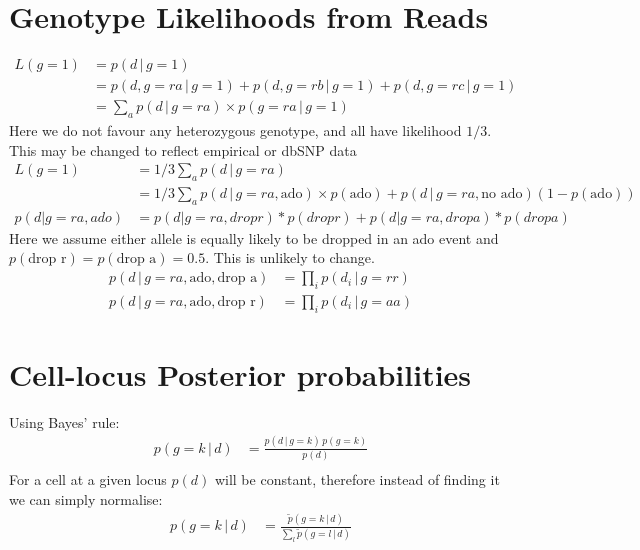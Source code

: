 \documentclass{article}
\begin{document}
\section{Genotype Likelihoods from Reads}
\begin{align*}
L(g=1) &= p(d\,|\,g=1)\\
&=p(d, g=ra \,|\, g=1) + p(d, g=rb \,|\, g=1) + p(d, g=rc \,|\, g=1)\\
&= \sum_a p(d \,|\, g=ra) \times p(g=ra \,|\, g=1)
\end{align*}
Here we do not favour any heterozygous genotype, and all have likelihood $1/3$. This may be changed to reflect empirical or dbSNP data
\begin{align*}
L(g=1) &= 1/3 \sum_a p(d \,|\, g=ra)\\
&= 1/3 \sum_a p(d \,|\, g=ra, \text{ado}) \times p(\text{ado}) + p(d \,|\, g=ra, \text{no ado})(1-p(\text{ado}))\\
p(d|g=ra, ado) &= p(d|g=ra, drop r) * p(drop r) + p(d|g=ra, drop a) * p(drop a)
\end{align*}
Here we assume either allele is equally likely to be dropped in an ado event and $p(\text{drop r}) = p(\text{drop a}) = 0.5$. This is unlikely to change.
\begin{align*}
p(d \,|\, g=ra, \text{ado}, \text{drop a}) &= \prod_i p(d_i \,|\, g=rr)\\
p(d \,|\, g=ra, \text{ado}, \text{drop r}) &= \prod_i p(d_i \,|\, g=aa)
\end{align*}

\section{Cell-locus Posterior probabilities}
Using Bayes' rule:
\begin{align*}
p(g=k\,|\, d) &= \frac{p(d\,|\,g=k)\,p(g=k)}{p(d)}\\
\end{align*}
For a cell at a given locus $p(d)$ will be constant, therefore instead of finding it we can simply normalise:
\begin{align*}
p(g=k\,|\,d) &= \frac{\tilde{p}(g=k\,|\,d)}{\sum_l\tilde{p}(g=l\,|\,d)}\\
\end{align*}
\end{document}
